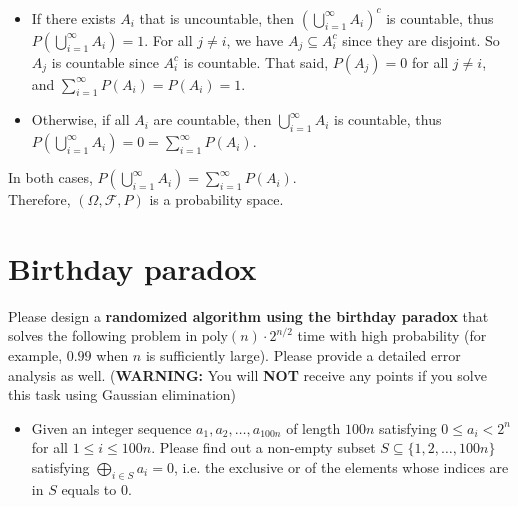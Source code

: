 \documentclass[a4paper, justified]{tufte-handout}
\begin{document}
\begin{solution}
\begin{itemize}
  \item If there exists $A_i$ that is uncountable, then $(\bigcup_{i=1}^\infty A_i)^c$ is countable, thus $P(\bigcup_{i=1}^\infty A_i) = 1$. 
  For all $j \neq i$, we have $A_j \subseteq A_i^c$ since they are disjoint. So $A_j$ is countable since $A_i^c$ is countable. That said, $P(A_j) = 0$ for all $j \neq i$, and $\sum_{i=1}^\infty P(A_i) = P(A_i) = 1$.
  \item Otherwise, if all $A_i$ are countable, then $\bigcup_{i=1}^\infty A_i$ is countable, thus $P(\bigcup_{i=1}^\infty A_i) = 0 = \sum_{i=1}^\infty P(A_i)$. 
  \end{itemize}
  In both cases, $P(\bigcup_{i=1}^\infty A_i) = \sum_{i=1}^\infty P(A_i)$.\\
  Therefore, $(\Omega, \mathcal{F}, P)$ is a probability space.
\end{solution}

\section{Birthday paradox}

\begin{problem}
  Please design a \textbf{randomized algorithm using the birthday paradox} that solves the following problem in \(\mathrm{poly}(n) \cdot 2^{n/2}\) time with high probability (for example, \(0.99\) when \(n\) is sufficiently large). Please provide a detailed error analysis as well. (\textbf{WARNING:} You will \textbf{NOT} receive any points if you solve this task using Gaussian elimination)
  \begin{itemize}
    \item Given an integer sequence \(a_1,a_2,\ldots,a_{100n}\) of length \(100 n\) satisfying \(0 \le a_i < 2^n\) for all \(1 \le i \le 100 n\). Please find out a non-empty subset \(S \subseteq \{1,2,\ldots,100n\}\) satisfying \(\bigoplus_{i \in S} a_i = 0\), i.e. the exclusive or of the elements whose indices are in \(S\) equals to \(0\).
  \end{itemize}
\end{problem}
\end{document}

